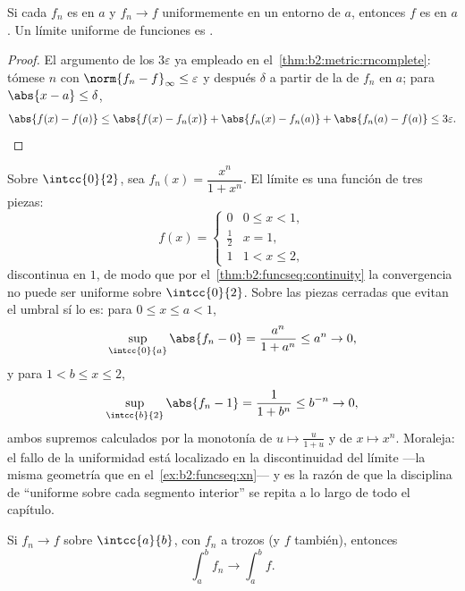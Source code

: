 \begin{theorem}[Continuidad]\label{thm:b2:funcseq:continuity}
Si cada $f_n$ es  en $a$ y $f_n \to f$ uniformemente en un
entorno de $a$, entonces $f$ es  en $a$. Un límite uniforme
de funciones  es .
\end{theorem}

\begin{proof}
El argumento de los $3\varepsilon$ ya empleado en el~\cref{thm:b2:metric:rncomplete}: tómese $n$ con $\norm{f_n -
f}_\infty \leq \varepsilon$ y después $\delta$ a partir de la
 de $f_n$ en $a$; para $\abs{x - a} \leq \delta$,
\[
\abs{f(x) - f(a)} \leq \abs{f(x) - f_n(x)} + \abs{f_n(x) - f_n(a)}
+ \abs{f_n(a) - f(a)} \leq 3\varepsilon . \qedhere
\]
\end{proof}

\begin{example}\label{ex:b2:funcseq:threshold}
Sobre $\intcc{0}{2}$, sea $f_n(x) = \dfrac{x^n}{1 + x^n}$. El límite
 es una función de tres piezas:
\[
f(x) = \begin{cases} 0 & 0 \leq x < 1,\\[2pt]
\tfrac12 & x = 1,\\[2pt]
1 & 1 < x \leq 2, \end{cases}
\]
discontinua en $1$, de modo que por el~\cref{thm:b2:funcseq:continuity} la convergencia no puede ser
uniforme sobre $\intcc{0}{2}$. Sobre las piezas cerradas que evitan
el umbral sí lo es: para $0 \leq x \leq a < 1$,
\[
\sup_{\intcc{0}{a}}\abs{f_n - 0}
= \frac{a^n}{1 + a^n} \leq a^n \to 0 ,
\]
y para $1 < b \leq x \leq 2$,
\[
\sup_{\intcc{b}{2}}\abs{f_n - 1}
= \frac{1}{1 + b^n} \leq b^{-n} \to 0 ,
\]
ambos supremos calculados por la monotonía de $u \mapsto
\frac{u}{1+u}$ y de $x \mapsto x^n$. Moraleja: el fallo de la
uniformidad está localizado en la discontinuidad del límite ---la
misma geometría que en el~\cref{ex:b2:funcseq:xn}--- y es la razón de
que la disciplina de ``uniforme sobre cada segmento interior'' se
repita a lo largo de todo el capítulo.
\end{example}

\begin{theorem}\label{thm:b2:funcseq:integration}
Si $f_n \to f$  sobre $\intcc{a}{b}$, con $f_n$ 
a trozos (y $f$ también), entonces
\[
\int_a^b f_n \longrightarrow \int_a^b f .
\]
\end{theorem}


